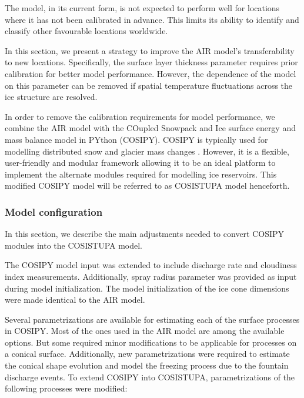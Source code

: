 The model, in its current form, is not expected to perform well for locations where it has not been calibrated
in advance. This limits its ability to identify and classify other favourable locations worldwide.

In this section, we present a strategy to improve the AIR model's transferability to new locations.
Specifically, the surface layer thickness parameter requires prior calibration for better model performance.
However, the dependence of the model on this parameter can be removed if spatial temperature fluctuations across
the ice structure are resolved.

In order to remove the calibration requirements for model performance, we combine the AIR model with the COupled
Snowpack and Ice surface energy and mass balance model in PYthon (COSIPY). COSIPY is typically used for
modelling distributed snow and glacier mass changes \citep{sauterCOSIPYV1Opensource2020}. However, it is a
flexible, user-friendly and modular framework allowing it to be an ideal platform to implement the alternate
modules required for modelling ice reservoirs. This modified COSIPY model will be referred to as COSISTUPA model
henceforth.

\subsubsection{Model configuration}

In this section, we describe the main adjustments needed to convert COSIPY modules into the COSISTUPA
model.

The COSIPY model input was extended to include discharge rate and cloudiness index measurements. Additionally,
spray radius parameter was provided as input during model initialization. The model initialization of the ice
cone dimensions were made identical to the AIR model.

Several parametrizations are available for estimating each of the surface processes in COSIPY. Most of the ones
used in the AIR model are among the available options. But some required minor
modifications to be applicable for processes on a conical surface. Additionally, new parametrizations were
required to estimate the conical shape evolution and model the freezing process due to the fountain discharge
events. To extend COSIPY into COSISTUPA, parametrizations of the following processes were modified:


